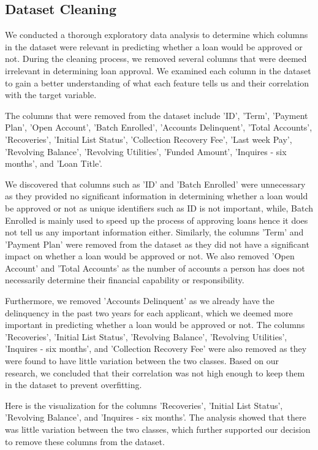 \documentclass[sigplan]{acmart}
\begin{document}
\subsection{Dataset Cleaning}
We conducted a thorough exploratory data analysis to determine which columns in the dataset were relevant in predicting whether a loan would be approved or not. During the cleaning process, we removed several columns that were deemed irrelevant in determining loan approval. We examined each column in the dataset to gain a better understanding of what each feature tells us and their correlation with the target variable.

The columns that were removed from the dataset include 'ID', 'Term', 'Payment Plan', 'Open Account', 'Batch Enrolled', 'Accounts Delinquent', 'Total Accounts', 'Recoveries', 'Initial List Status', 'Collection Recovery Fee', 'Last week Pay', 'Revolving Balance', 'Revolving Utilities', 'Funded Amount', 'Inquires - six months', and 'Loan Title'.

We discovered that columns such as 'ID' and 'Batch Enrolled' were unnecessary as they provided no significant information in determining whether a loan would be approved or not as unique identifiers such as ID is not important, while, Batch Enrolled is mainly used to speed up the process of approving loans hence it does not tell us any important information either.
Similarly, the columns 'Term' and 'Payment Plan' were removed from the dataset as they did not have a significant impact on whether a loan would be approved or not. We also removed 'Open Account' and 'Total Accounts' as the number of accounts a person has does not necessarily determine their financial capability or responsibility.

Furthermore, we removed 'Accounts Delinquent' as we already have the delinquency in the past two years for each applicant, which we deemed more important in predicting whether a loan would be approved or not. The columns 'Recoveries', 'Initial List Status', 'Revolving Balance', 'Revolving Utilities', 'Inquires - six months', and 'Collection Recovery Fee' were also removed as they were found to have little variation between the two classes. Based on our research, we concluded that their correlation was not high enough to keep them in the dataset to prevent overfitting.

Here is the visualization for the columns 'Recoveries', 'Initial List Status', 'Revolving Balance', and 'Inquires - six months'. The analysis showed that there was little variation between the two classes, which further supported our decision to remove these columns from the dataset.
\end{document}
